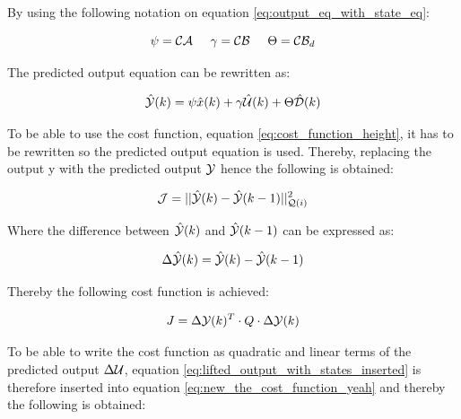 By using the following notation on equation \ref{eq:output_eq_with_state_eq}:


\begin{equation}
 \psi = \CMcal{C}\CMcal{A}  \hspace{5mm} \gamma = \CMcal{C}\CMcal{B} \hspace{5mm}  \Theta = \CMcal{C}\CMcal{B}_{d}
\end{equation}

The predicted output equation can be rewritten as: 

\begin{equation}\label{eq:lifted_output_with_states_inserted}
	\hat{\CMcal{Y}}(k) = \psi \hat{x}(k) + \gamma \hat{\CMcal{U}}(k) + \Theta \hat{\CMcal{D}}(k)
\end{equation}



To be able to use the cost function, equation \ref{eq:cost_function_height}, it has to be rewritten so the predicted output equation is used. Thereby, replacing the output y with the predicted output $\CMcal{Y}$ hence the following is obtained:

\begin{equation}\label{eq:new_the_cost_function_yeah}
	\CMcal{J} = ||\hat{\CMcal{Y}}(k)-\hat{\CMcal{Y}}(k-1)||_{\CMcal{Q}(i)}^2
\end{equation}

Where the difference between $\hat{\CMcal{Y}}(k)$ and $\hat{\CMcal{Y}}(k-1)$ can be expressed as:

\begin{equation}
	\Delta \hat{\CMcal{Y}}(k) =\hat{\CMcal{Y}}(k)-\hat{\CMcal{Y}}(k-1) 
\end{equation}

Thereby the following cost function is achieved:

\begin{equation}\label{eq:delta_cost_function}
	J = \Delta\CMcal{Y}(k)^T \cdot Q \cdot \Delta\CMcal{Y}(k)
\end{equation}

To be able to write the cost function as quadratic and linear terms of the predicted output $\Delta\CMcal{U}$, equation \ref{eq:lifted_output_with_states_inserted} is therefore inserted into equation \ref{eq:new_the_cost_function_yeah} and thereby the following is obtained:

